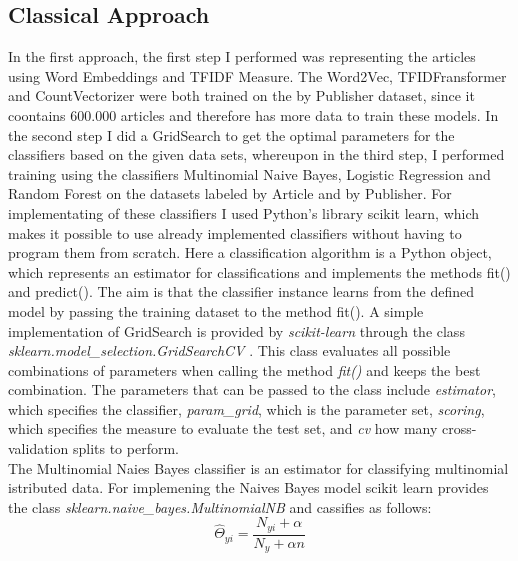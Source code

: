 \documentclass[a4paper, 11pt,titlepage,oneside,openany]{book}
\begin{document}
\subsection{Classical Approach}
In the first approach, the first step I performed was representing the articles using Word Embeddings and TFIDF Measure. The Word2Vec, TFIDFransformer and CountVectorizer were both trained on the by Publisher dataset, since it coontains 600.000  articles and therefore has more data to train these models. In the second step I did a GridSearch to get the optimal parameters for the classifiers based on the given data sets, whereupon in the third step, I performed training using the classifiers Multinomial Naive Bayes, Logistic Regression and Random Forest on the datasets labeled by Article and by Publisher. For implementating of these classifiers I used Python's library scikit learn, which makes it possible to use already implemented classifiers without having to program them from scratch. Here a classification algorithm is a Python object, which represents an estimator for classifications and implements the methods fit() and predict(). The aim is that the classifier instance learns from the defined model by passing the training dataset to the method fit().
\newpage
\indent A simple implementation of GridSearch is provided by \textit{scikit-learn} through the class \textit{sklearn.model\_selection.GridSearchCV} \cite{codegridsearch}. This class evaluates all possible combinations of parameters when calling the method \textit{fit()} and keeps the best combination. The parameters that can be passed to the class include \textit{estimator}, which specifies the classifier, \textit{param\_grid}, which is the parameter set, \textit{scoring}, which specifies the measure to evaluate the test set, and \textit{cv} how many cross-validation splits to perform. \\
\indent The Multinomial Naies Bayes classifier is an estimator for classifying multinomial istributed data. For implemening the Naives Bayes model scikit learn provides the class \textit{sklearn.naive\_bayes.MultinomialNB} \cite{codemulinomialnb} and cassifies as follows:
\[
\hat{\Theta}_{yi}=\frac{N_{yi}+\alpha}{N_y + \alpha n}
\]
\end{document}
